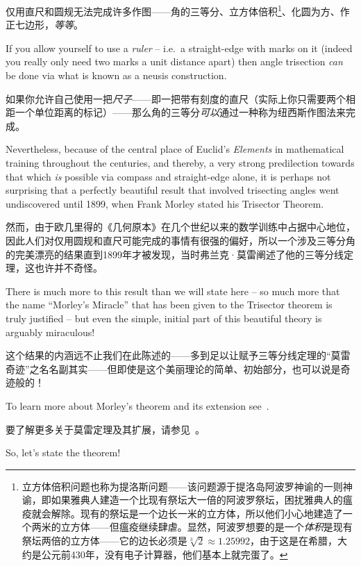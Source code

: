 仅用直尺和圆规无法完成许多作图——角的三等分、立方体倍积\footnote{立方体倍积问题也称为提洛斯问题——该问题源于提洛岛阿波罗神谕的一则神谕，即如果雅典人建造一个比现有祭坛大一倍的阿波罗祭坛，困扰雅典人的瘟疫就会解除。现有的祭坛是一个边长一米的立方体，所以他们小心地建造了一个两米的立方体——但瘟疫继续肆虐。显然，阿波罗想要的是一个\emph{体积}是现有祭坛两倍的立方体——它的边长必须是$\sqrt[3]{2} \approx 1.25992$，由于这是在希腊，大约是公元前430年，没有电子计算器，他们基本上就完蛋了。}、化圆为方、作正七边形，\emph{等等}。

If you allow yourself to use a \emph{ruler} -- i.e.\ a straight-edge with
marks on it (indeed you really only need two marks a unit distance apart) 
then angle trisection \emph{can} be done via what is known as a 
neusis construction.

如果你允许自己使用一把\emph{尺子}——即一把带有刻度的直尺（实际上你只需要两个相距一个单位距离的标记）——那么角的三等分\emph{可以}通过一种称为纽西斯作图法来完成。

Nevertheless, because of the central place of Euclid's \emph{Elements} in
mathematical training throughout the centuries, and thereby, a very
strong predilection towards that which \emph{is} possible via compass and straight-edge
alone, it is perhaps not surprising that a perfectly beautiful result that
involved trisecting angles went undiscovered until 1899, when Frank Morley
stated his Trisector Theorem.

然而，由于欧几里得的《几何原本》在几个世纪以来的数学训练中占据中心地位，因此人们对仅用圆规和直尺可能完成的事情有很强的偏好，所以一个涉及三等分角的完美漂亮的结果直到1899年才被发现，当时弗兰克·莫雷阐述了他的三等分线定理，这也许并不奇怪。

There is much more to this result than we will
state here -- so much more that the name ``Morley's Miracle'' that has been
given to the Trisector theorem is truly justified -- but even the simple,
initial part of this beautiful theory is arguably miraculous!

这个结果的内涵远不止我们在此陈述的——多到足以让赋予三等分线定理的“莫雷奇迹”之名名副其实——但即使是这个美丽理论的简单、初始部分，也可以说是奇迹般的！

To learn more
about Morley's theorem and its extension see~\cite{lighthouse}.

要了解更多关于莫雷定理及其扩展，请参见~\cite{lighthouse}。

So, let's state the theorem!

